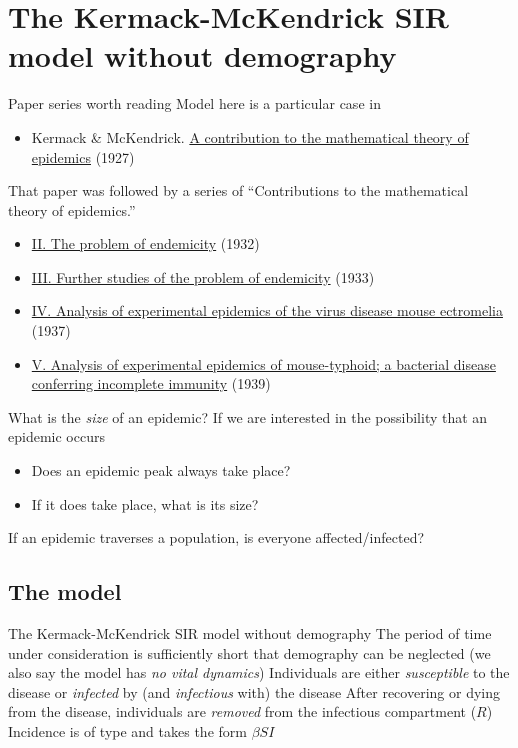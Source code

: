 \documentclass[aspectratio=43]{beamer}
\begin{document}
\section{The Kermack-McKendrick SIR model without demography}

\begin{frame}{Paper series worth reading}
Model here is a particular case in
\begin{itemize}
  \item Kermack \& McKendrick. \href{https://doi.org/10.1098/rspa.1927.0118}{A contribution to the mathematical theory of epidemics} (1927)
\end{itemize}
\vfill
That paper was followed by a series of ``Contributions to the mathematical theory of epidemics.''
\begin{itemize}
  \item \href{https://doi.org/10.1098/rspa.1932.0171}{II. The problem of endemicity} (1932)
  \item \href{https://doi.org/10.1098/rspa.1933.0106}{III. Further studies of the problem of endemicity} (1933)
  \item \href{https://doi.org/10.1017/S0022172400034902}{IV. Analysis of experimental epidemics of the virus disease mouse ectromelia} (1937)
  \item \href{https://doi.org/10.1017/S0022172400011918}{V. Analysis of experimental epidemics of mouse-typhoid; a bacterial disease conferring incomplete immunity} (1939)
\end{itemize}
\end{frame}

\begin{frame}{What is the \emph{size} of an epidemic?}
\bbullet 
If we are interested in the possibility that an epidemic occurs
\begin{itemize}
  \item Does an epidemic peak always take place?
  \item If it does take place, what is its size?
\end{itemize}
\vfill
\bbullet If an epidemic traverses a population, is everyone affected/infected?
\end{frame}


\subsection{The model}
\begin{frame}{The Kermack-McKendrick SIR model without demography}
\bbullet The period of time under consideration is sufficiently short that demography can be neglected (we also say the model has \emph{no vital dynamics})
\vfill
\bbullet Individuals are either \emph{susceptible} to the disease or \emph{infected} by (and \emph{infectious} with) the disease
\vfill
\bbullet After recovering or dying from the disease, individuals are \emph{removed} from the infectious compartment ($R$)
\vfill
\bbullet Incidence is of  type and takes the form $\beta SI$
\end{frame}
\end{document}
